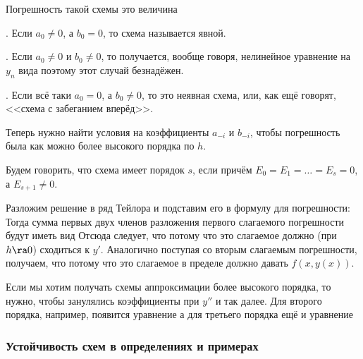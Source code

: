 \documentclass[a4paper]{article}
\begin{document}
Погрешность такой схемы это величина 

\begin{df}

. Если $a_0 \ne 0$, а $b_0 = 0$, то схема называется явной.

. Если $a_0 \ne 0$ и $b_0 \ne 0$, то получается, вообще говоря,
нелинейное уравнение на $y_n$ вида  поэтому этот случай безнадёжен.

. Если всё таки $a_0 = 0$, а $b_0 \ne 0$, то это неявная схема,
или, как ещё говорят, <<схема с забеганием вперёд>>.
\end{df}

Теперь нужно найти условия на коэффициенты $a_{-i}$ и $b_{-i}$, чтобы
погрешность была как можно более высокого порядка по $h$.

\begin{df}
Будем говорить, что схема имеет порядок $s$, если  причём $E_0 = E_1 = \dots = E_s = 0$, а $E_{s+1} \ne 0$.
\end{df}

Разложим решение в ряд Тейлора и подставим его в формулу для
погрешности:  Тогда сумма первых двух членов разложения первого
слагаемого погрешности будут иметь вид   Отсюда следует, что
потому что это слагаемое должно (при $h \ra 0$) сходиться к $y'$.
Аналогично поступая со вторым слагаемым погрешности, получаем, что
 потому что это слагаемое в пределе
должно давать $f(x,y(x))$.

Если мы хотим получать схемы аппроксимации более высокого порядка, то
нужно, чтобы занулялись коэффициенты при $y''$ и так далее.  Для
второго порядка, например, появится уравнение  а для третьего порядка ещё и
уравнение 

\subsubsection{Устойчивость схем в определениях и примерах}
\end{document}
